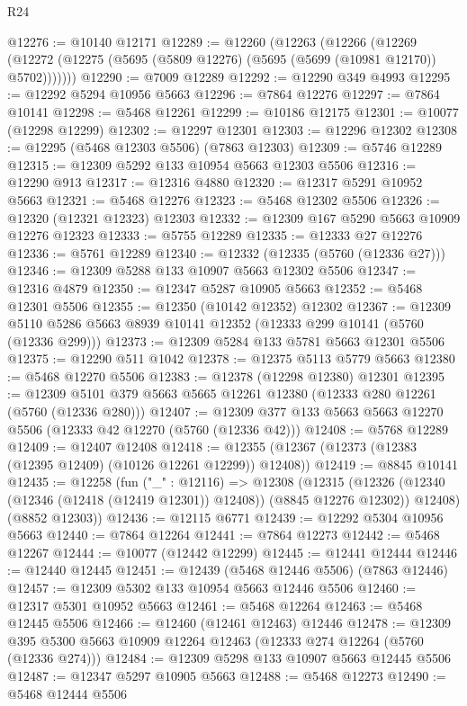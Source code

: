 \begin{lexlean}{R24}
\begin{coremodule}
@12276 := @10140 @12171
@12289 := @12260
    (@12263
      (@12266
        (@12269 (@12272 (@12275 (@5695 (@5809 @12276) (@5695 (@5699 (@10981 @12170)) @5702)))))))
@12290 := @7009 @12289
@12292 := @12290 @349 @4993
@12295 := @12292 @5294 @10956 @5663
@12296 := @7864 @12276
@12297 := @7864 @10141
@12298 := @5468 @12261
@12299 := @10186 @12175
@12301 := @10077 (@12298 @12299)
@12302 := @12297 @12301
@12303 := @12296 @12302
@12308 := @12295 (@5468 @12303 @5506) (@7863 @12303)
@12309 := @5746 @12289
@12315 := @12309 @5292 @133 @10954 @5663 @12303 @5506
@12316 := @12290 @913
@12317 := @12316 @4880
@12320 := @12317 @5291 @10952 @5663
@12321 := @5468 @12276
@12323 := @5468 @12302 @5506
@12326 := @12320 (@12321 @12323) @12303
@12332 := @12309 @167 @5290 @5663 @10909 @12276 @12323
@12333 := @5755 @12289
@12335 := @12333 @27 @12276
@12336 := @5761 @12289
@12340 := @12332 (@12335 (@5760 (@12336 @27)))
@12346 := @12309 @5288 @133 @10907 @5663 @12302 @5506
@12347 := @12316 @4879
@12350 := @12347 @5287 @10905 @5663
@12352 := @5468 @12301 @5506
@12355 := @12350 (@10142 @12352) @12302
@12367 := @12309 @5110 @5286 @5663 @8939 @10141 @12352 (@12333 @299 @10141 (@5760 (@12336 @299)))
@12373 := @12309 @5284 @133 @5781 @5663 @12301 @5506
@12375 := @12290 @511 @1042
@12378 := @12375 @5113 @5779 @5663
@12380 := @5468 @12270 @5506
@12383 := @12378 (@12298 @12380) @12301
@12395 := @12309 @5101 @379 @5663 @5665 @12261 @12380 (@12333 @280 @12261 (@5760 (@12336 @280)))
@12407 := @12309 @377 @133 @5663 @5663 @12270 @5506 (@12333 @42 @12270 (@5760 (@12336 @42)))
@12408 := @5768 @12289
@12409 := @12407 @12408
@12418 := @12355 (@12367 (@12373 (@12383 (@12395 @12409) (@10126 @12261 @12299)) @12408))
@12419 := @8845 @10141
@12435 := @12258
    (fun ("_" : @12116) =>
    @12308
      (@12315
        (@12326 (@12340 (@12346 (@12418 (@12419 @12301)) @12408)) (@8845 @12276 @12302))
        @12408)
      (@8852 @12303))
@12436 := @12115 @6771
@12439 := @12292 @5304 @10956 @5663
@12440 := @7864 @12264
@12441 := @7864 @12273
@12442 := @5468 @12267
@12444 := @10077 (@12442 @12299)
@12445 := @12441 @12444
@12446 := @12440 @12445
@12451 := @12439 (@5468 @12446 @5506) (@7863 @12446)
@12457 := @12309 @5302 @133 @10954 @5663 @12446 @5506
@12460 := @12317 @5301 @10952 @5663
@12461 := @5468 @12264
@12463 := @5468 @12445 @5506
@12466 := @12460 (@12461 @12463) @12446
@12478 := @12309 @395 @5300 @5663 @10909 @12264 @12463 (@12333 @274 @12264 (@5760 (@12336 @274)))
@12484 := @12309 @5298 @133 @10907 @5663 @12445 @5506
@12487 := @12347 @5297 @10905 @5663
@12488 := @5468 @12273
@12490 := @5468 @12444 @5506

\end{coremodule}
\end{lexlean}
